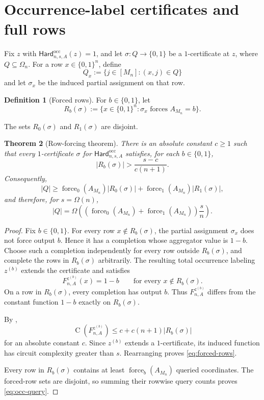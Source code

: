 \documentclass[11pt]{article}
\newtheorem{theorem}{Theorem}[section]
\theoremstyle{definition}
\newtheorem{definition}[theorem]{Definition}
\newcommand{\bits}{\{0,1\}}
\newcommand{\Ckt}{\operatorname{C}}
\newcommand{\Force}{\operatorname{force}}
\newcommand{\HardO}{\mathsf{Hard}^{\mathrm{occ}}}
\begin{document}
\section{Occurrence-label certificates and full rows}\label{sec:rows}

Fix $z$ with $\HardO_{n,s,A}(z)=1$, and let $\sigma:Q\to\bits$ be a $1$-certificate at $z$, where $Q\subseteq\Omega_n$.  For a row $x\in\bits^n$, define
\[
  Q_x:=\{j\in[M_n]:(x,j)\in Q\}
\]
and let $\sigma_x$ be the induced partial assignment on that row.

\begin{definition}[Forced rows]\label{def:forced-rows}
For $b\in\bits$, let
\[
  R_b(\sigma)
  :=\{x\in\bits^n:\sigma_x\text{ forces }A_{M_n}=b\}.
\]
\end{definition}

The sets $R_0(\sigma)$ and $R_1(\sigma)$ are disjoint.

\begin{theorem}[Row-forcing theorem]\label{thm:row-forcing}
There is an absolute constant $c\ge1$ such that every $1$-certificate $\sigma$ for $\HardO_{n,s,A}$ satisfies, for each $b\in\bits$,
\begin{equation}\label{eq:forced-rows}
  |R_b(\sigma)|
  >\frac{s-c}{c(n+1)}.
\end{equation}
Consequently,
\begin{equation}\label{eq:occ-query}
  |Q|
  \ge
  \Force_0(A_{M_n})|R_0(\sigma)|
  +\Force_1(A_{M_n})|R_1(\sigma)|,
\end{equation}
and therefore, for $s=\Omega(n)$,
\begin{equation}\label{eq:occ-query-asymptotic}
  |Q|
  =\Omega\!\left(
    (\Force_0(A_{M_n})+\Force_1(A_{M_n}))\frac{s}{n}
  \right).
\end{equation}
\end{theorem}

\begin{proof}
Fix $b\in\bits$.  For every row $x\notin R_b(\sigma)$, the partial assignment $\sigma_x$ does not force output $b$.  Hence it has a completion whose aggregator value is $1-b$.  Choose such a completion independently for every row outside $R_b(\sigma)$, and complete the rows in $R_b(\sigma)$ arbitrarily.  The resulting total occurrence labeling $z^{(b)}$ extends the certificate and satisfies
\[
  F_{n,A}^{z^{(b)}}(x)=1-b
  \qquad\text{for every }x\notin R_b(\sigma).
\]
On a row in $R_b(\sigma)$, every completion has output $b$.  Thus $F_{n,A}^{z^{(b)}}$ differs from the constant function $1-b$ exactly on $R_b(\sigma)$.

By ,
\[
  \Ckt(F_{n,A}^{z^{(b)}})
  \le c+c(n+1)|R_b(\sigma)|
\]
for an absolute constant $c$.  Since $z^{(b)}$ extends a $1$-certificate, its induced function has circuit complexity greater than $s$.  Rearranging proves \eqref{eq:forced-rows}.

Every row in $R_b(\sigma)$ contains at least $\Force_b(A_{M_n})$ queried coordinates.  The forced-row sets are disjoint, so summing their rowwise query counts proves \eqref{eq:occ-query}.
\end{proof}
\end{document}
